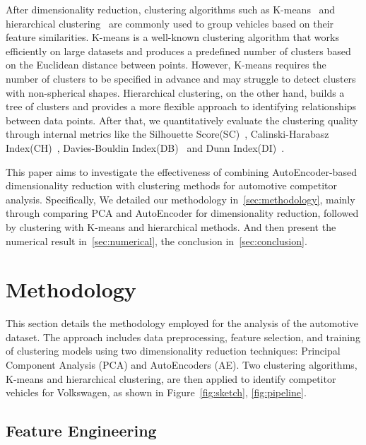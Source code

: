\documentclass{article} %
\newcommand{\orangetext}[1]{\textcolor{orange!75!black}{#1}}
\begin{document}
After dimensionality reduction, clustering algorithms such as K-means~\citep{macqueen1967kmeans,jain2010kmeans} and hierarchical clustering~\citep{lance1967hierarchical,murtagh2012hierarchical} are commonly used to group vehicles based on their feature similarities.
K-means is a well-known clustering algorithm that works efficiently on large datasets and produces a predefined number of clusters based on the Euclidean distance between points.
However, K-means requires the number of clusters to be specified in advance and may struggle to detect clusters with non-spherical shapes. Hierarchical clustering, on the other hand, builds a tree of clusters and provides a more flexible approach to identifying relationships between data points.
After that, we quantitatively evaluate the clustering quality through internal metrics like the Silhouette Score(SC)~\citep{rousseeuw1987silhouettes}, Calinski-Harabasz Index(CH)~\citep{calinski1974dendrite}, Davies-Bouldin Index(DB)~\citep{davies1979cluster} and Dunn Index(DI)~\citep{dunn1974well}.

This paper aims to investigate the effectiveness of combining AutoEncoder-based dimensionality reduction with clustering methods for automotive competitor analysis.
Specifically, We detailed our methodology in~\autoref{sec:methodology}, mainly through comparing \orangetext{PCA} and \orangetext{AutoEncoder} for dimensionality reduction, followed by clustering with \orangetext{K-means} and \orangetext{hierarchical} methods.
And then present the numerical result in~\autoref{sec:numerical}, the conclusion in~\autoref{sec:conclusion}.

\section{Methodology}
\label{sec:methodology}

This section details the methodology employed for the analysis of the automotive dataset.
The approach includes data preprocessing, feature selection, and training of clustering models using two dimensionality reduction techniques: Principal Component Analysis (PCA) and AutoEncoders (AE).
Two clustering algorithms, K-means and hierarchical clustering, are then applied to identify competitor vehicles for Volkswagen, as shown in Figure~\ref{fig:sketch}, \ref{fig:pipeline}.

\subsection{Feature Engineering}
\end{document}
